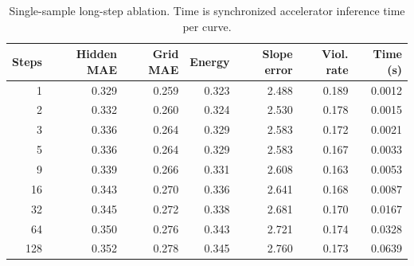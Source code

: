 \begin{table}[t]
\caption{Single-sample long-step ablation. Time is synchronized accelerator inference time per curve.}
\label{tab:long_steps}
\centering\scriptsize
\begin{tabular}{rrrrrrr}
\toprule
Steps & Hidden MAE & Grid MAE & Energy & Slope error & Viol. rate & Time (s)\\
\midrule
1 & 0.329 & 0.259 & 0.323 & 2.488 & 0.189 & 0.0012\\
2 & 0.332 & 0.260 & 0.324 & 2.530 & 0.178 & 0.0015\\
3 & 0.336 & 0.264 & 0.329 & 2.583 & 0.172 & 0.0021\\
5 & 0.336 & 0.264 & 0.329 & 2.583 & 0.167 & 0.0033\\
9 & 0.339 & 0.266 & 0.331 & 2.608 & 0.163 & 0.0053\\
16 & 0.343 & 0.270 & 0.336 & 2.641 & 0.168 & 0.0087\\
32 & 0.345 & 0.272 & 0.338 & 2.681 & 0.170 & 0.0167\\
64 & 0.350 & 0.276 & 0.343 & 2.721 & 0.174 & 0.0328\\
128 & 0.352 & 0.278 & 0.345 & 2.760 & 0.173 & 0.0639\\
\bottomrule
\end{tabular}
\end{table}